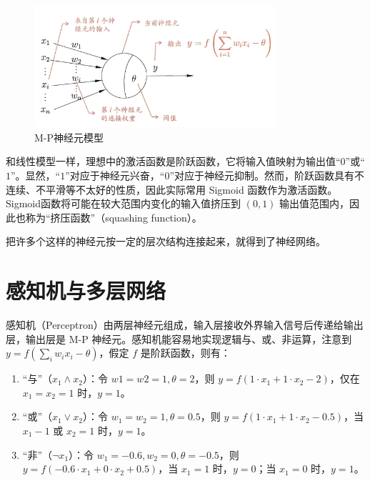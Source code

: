 \documentclass[12pt, a4paper]{article} %
\begin{document}
\begin{figure}[H]
    \centering
    \includegraphics[width=0.8\textwidth]{../img/5-2-M-P神经元模型.png}
    \caption{M-P神经元模型}
    \label{fig:M-P神经元模型}
\end{figure}

和线性模型一样，理想中的激活函数是阶跃函数，它将输入值映射为输出值“$0$”或“$1$”。显然，“$1$”对应于神经元兴奋，“$0$”对应于神经元抑制。然而，阶跃函数具有不连续、不平滑等不太好的性质，因此实际常用 Sigmoid 函数作为激活函数。Sigmoid函数将可能在较大范围内变化的输入值挤压到 $(0, 1)$ 输出值范围内，因此也称为“挤压函数”（squashing function）。

把许多个这样的神经元按一定的层次结构连接起来，就得到了神经网络。

\section{感知机与多层网络}

感知机（Perceptron）由两层神经元组成，输入层接收外界输入信号后传递给输出层，输出层是 M-P 神经元。感知机能容易地实现逻辑与、或、非运算，注意到 $\displaystyle y = f( \sum_i w_i x_i - \theta)$，假定 $f$ 是阶跃函数，则有：

\begin{enumerate}[\hspace*{2em} i.]
    \item “与”（$x_1 \wedge x_2$）：令 $w1 = w2 = 1, \theta = 2$，则 $y = f(1 \cdot x_1 + 1 \cdot x_2 - 2)$，仅在 $x_1 = x_2 = 1$ 时，$y = 1$。
    \item “或”（$x_1 \vee x_2$）：令 $w_1 = w_2 = 1, \theta = 0.5$，则 $y = f(1 \cdot x_1 + 1 \cdot x_2 - 0.5)$，当 $x_1 - 1$ 或 $x_2 = 1$ 时，$y = 1$。
    \item “非”（$\neg x_1$）：令 $w_1 = -0.6, w_2 = 0, \theta = - 0.5$，则 $y = f(-0.6 \cdot x_1 + 0 \cdot x_2 + 0.5)$，当 $x_1 = 1$ 时，$y = 0$；当 $x_1 = 0$ 时，$y = 1$。
\end{enumerate}
\end{document}
